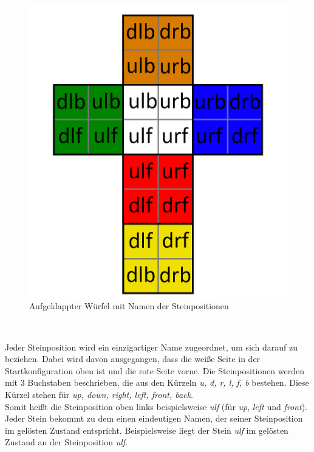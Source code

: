 \documentclass[12pt,a4paper, usenames, dvipsnames]{article}
\theoremstyle{mystyle}
\theoremstyle{definition}
\begin{document}
\begin{minipage}[b][][b]{0.43\textwidth}
\begin{figure}[H]
\centering
\includegraphics[scale=0.15]{foldedout_cage.png}
\caption[Aufgeklappter Würfel mit Namen der Steinpositionen]{Aufgeklappter Würfel mit Namen der Steinpositionen}
\label{Abbildung_SteinpositionNamenFoldetOut}
\end{figure}

\end{minipage}\begin{minipage}[b][][b]{0.04\textwidth}$\ $ \end{minipage}


Jeder Steinposition wird ein einzigartiger Name zugeordnet, um sich darauf zu beziehen. Dabei wird davon ausgegangen, dass die weiße Seite in der Startkonfiguration oben ist und die rote Seite vorne. Die Steinpositionen werden mit 3 Buchstaben beschrieben, die aus den Kürzeln \textit{u, d, r, l, f, b} bestehen. Diese Kürzel stehen für \textit{up, down, right, left, front, back}. \\
Somit heißt die Steinposition oben links beispielsweise \textit{ulf} (für \textit{up}, \textit{left} und \textit{front}). 
Jeder Stein bekommt zu dem einen eindeutigen Namen, der seiner Steinposition im gelösten Zustand entspricht. Beispielsweise liegt der Stein \textit{ulf} im gelösten Zustand an der Steinposition \textit{ulf}.
\end{document}
